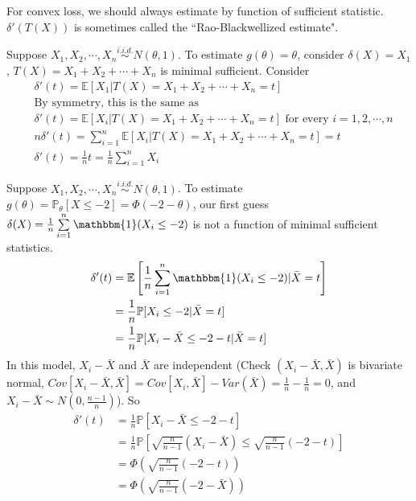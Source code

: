 \documentclass[a4paper]{article}
\begin{document}
\begin{note} For convex loss, we should always estimate by function of sufficient statistic. $\delta'(T(X))$ is sometimes called the ``Rao-Blackwellized estimate".
\end{note}

\begin{eg}
	Suppose $X_1,X_2, \cdots, X_n \stackrel{i.i.d.}{\sim} N(\theta,1)$. To estimate $g(\theta)=\theta$, consider $\delta(X) = X_1$, $T(X)=X_1+X_2+\cdots+X_n$ is minimal sufficient. Consider
	\begin{equation}
		\begin{aligned}
			&\delta'(t) = \mathbb{E}[X_1|T(X)=X_1+X_2+\cdots+X_n=t] \\
			&\text{By symmetry, this is the same as} \\
			&\delta'(t) = \mathbb{E}[X_i|T(X)=X_1+X_2+\cdots+X_n=t] \text{ for every } i =1,2,\cdots,n \\
			&n\delta'(t) = \sum\limits_{i=1}^n \mathbb{E}[X_i|T(X)=X_1+X_2+\cdots+X_n=t] = t \\
			&\delta'(t) = \frac{1}{n}t = \frac{1}{n}\sum\limits_{i=1}^nX_i
		\end{aligned}
	\end{equation}
\end{eg}

\begin{eg}
	Suppose $X_1,X_2,\cdots,X_n \stackrel{i.i.d.}{\sim} N(\theta,1)$. To estimate $g(\theta)=\mathbb{P}_\theta[X \leq -2] = \Phi(-2-\theta)$, our first guess $\delta(X)=\frac{1}{n}\sum\limits_{i=1}^n \mathbbm{1}(X_i \leq -2)$ is not a function of minimal sufficient statistics.
	\begin{equation*}
		\begin{aligned}
			\delta'(t) &= \mathbb{E}\left[\frac{1}{n}\sum\limits_{i=1}^n \mathbbm{1}(X_i \leq -2)|\bar X =t\right] \\
			&= \frac{1}{n}\mathbb{P}[X_i \leq -2|\bar X =t] \\
			&= \frac{1}{n}\mathbb{P}[X_i - \bar X \leq -2 -t |\bar X =t]\\
		\end{aligned}
	\end{equation*}
	In this model, $X_i - \bar X$ and $\bar X$ are independent (Check $(X_i - \bar X,\bar X)$ is bivariate normal, $Cov[X_i - \bar X,\bar X]=Cov[X_i,\bar X]-Var(\bar X)=\frac{1}{n}-\frac{1}{n}=0$, and $X_i - \bar X \sim N(0,\frac{n-1}{n})$). So
	\begin{equation}
		\begin{aligned}
				\delta'(t) &= \frac{1}{n}\mathbb{P}[X_i - \bar X \leq -2 -t]\\
				&= \frac{1}{n}\mathbb{P}\left[\sqrt{\frac{n}{n-1}}(X_i-\bar X) \leq \sqrt{\frac{n}{n-1}}(-2 -t)\right] \\
				&= \Phi \left(\sqrt{\frac{n}{n-1}}(-2 -t)\right) \\
				&= \Phi \left(\sqrt{\frac{n}{n-1}}(-2 -\bar X)\right)
		\end{aligned}
	\end{equation}
\end{eg}
\end{document}
